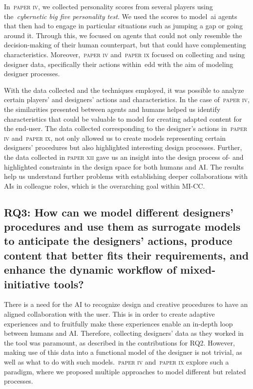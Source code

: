 In~\textsc{paper iv}, we collected personality scores from several players using the~\emph{cybernetic big five personality test}. We used the scores to model~\acrshort{ai} agents that then had to engage in particular situations such as jumping a gap or going around it. Through this, we focused on agents that could not only resemble the decision-making of their human counterpart, but that could have complementing characteristics. Moreover,~\textsc{paper iv} and~\textsc{paper ix} focused on collecting and using designer data, specifically their actions within~\acrshort{edd} with the aim of modeling designer processes.

With the data collected and the techniques employed, it was possible to analyze certain players' and designers' actions and characteristics. In the case of~\textsc{paper iv}, the similarities presented between agents and humans helped us identify characteristics that could be valuable to model for creating adapted content for the end-user. The data collected corresponding to the designer's actions in~\textsc{paper iv} and~\textsc{paper ix}, not only allowed us to create models representing certain designers' procedures but also highlighted interesting design processes. Further, the data collected in \textsc{paper xii} gave us an insight into the design process of- and highlighted constraints in the design space for both humans and AI. The results help us understand further problems with establishing deeper collaborations with AIs in colleague roles, which is the overarching goal within MI-CC.

\subsection[Research Question 3]{RQ3: How can we model different designers' procedures and use them as surrogate models to anticipate the designers' actions, produce content that better fits their requirements, and enhance the dynamic workflow of mixed-initiative tools?}

There is a need for the AI to recognize design and creative procedures to have an aligned collaboration with the user. This is in order to create adaptive experiences and to fruitfully make these experiences enable an in-depth loop between humans and AI. Therefore, collecting designers' data as they worked in the tool was paramount, as described in the contributions for RQ2. However, making use of this data into a functional model of the designer is not trivial, as well as what to do with such models.~\textsc{paper iv} and~\textsc{paper ix} explore such a paradigm, where we proposed multiple approaches to model different but related processes. 

